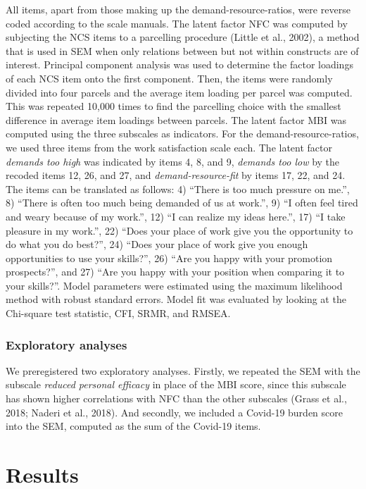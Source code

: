 \documentclass[
  english,
  man,floatsintext]{apa6}
\begin{document}
All items, apart from those making up the demand-resource-ratios, were reverse coded according to the scale manuals.
The latent factor NFC was computed by subjecting the NCS items to a parcelling procedure (Little et al., 2002), a method that is used in SEM when only relations between but not within constructs are of interest.
Principal component analysis was used to determine the factor loadings of each NCS item onto the first component.
Then, the items were randomly divided into four parcels and the average item loading per parcel was computed.
This was repeated 10,000 times to find the parcelling choice with the smallest difference in average item loadings between parcels.
The latent factor MBI was computed using the three subscales as indicators.
For the demand-resource-ratios, we used three items from the work satisfaction scale each.
The latent factor \emph{demands too high} was indicated by items 4, 8, and 9, \emph{demands too low} by the recoded items 12, 26, and 27, and \emph{demand-resource-fit} by items 17, 22, and 24.
The items can be translated as follows: 4) ``There is too much pressure on me.'', 8) ``There is often too much being demanded of us at work.'', 9) ``I often feel tired and weary because of my work.'', 12) ``I can realize my ideas here.'', 17) ``I take pleasure in my work.'', 22) ``Does your place of work give you the opportunity to do what you do best?'', 24) ``Does your place of work give you enough opportunities to use your skills?'', 26) ``Are you happy with your promotion prospects?'', and 27) ``Are you happy with your position when comparing it to your skills?''.
Model parameters were estimated using the maximum likelihood method with robust standard errors.
Model fit was evaluated by looking at the Chi-square test statistic, CFI, SRMR, and RMSEA.

\hypertarget{exploratory-analyses}{%
\subsubsection{Exploratory analyses}\label{exploratory-analyses}}

We preregistered two exploratory analyses.
Firstly, we repeated the SEM with the subscale \emph{reduced personal efficacy} in place of the MBI score, since this subscale has shown higher correlations with NFC than the other subscales (Grass et al., 2018; Naderi et al., 2018).
And secondly, we included a Covid-19 burden score into the SEM, computed as the sum of the Covid-19 items.

\hypertarget{results}{%
\section{Results}\label{results}}
\end{document}

